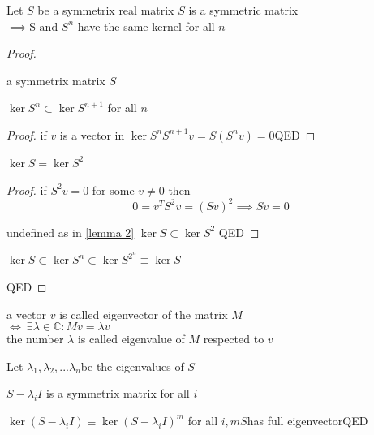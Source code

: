 \label{#1}

Let $S$ be a symmetrix real matrix
\label{same kernel lemma}
$S$ is a symmetric matrix\\$\implies $S$ \text{ and } S^n$ h​ave the same kernel for all $n$

\begin{proof}
\label{input}

​a symmetrix matrix $S$
\label{lemma 2}

$\ker S^n \subset \ker S^{n+1}$ for all $n$​

\begin{proof}
\label{#17}
if $v$ is a vector in $\ker S^n$​
\label{#18}
​$S^{n+1}v = S(S^n v) = 0$
\label{#19}
​QED

\end{proof}
\label{lemma 1}

$\ker S = \ker S^2$ ​

\begin{proof}
\label{#15}
​if $S^2v = 0$ for some $v \not = 0$ then \\$​$ $$0 = v^TS^2v = (Sv)^2 \implies Sv = 0$$

undefined%
\label{#14}
​as in \ref{lemma 2} $\ker S \subset \ker S^2$
\label{#16}
QED​

\end{proof}
\label{#13}

$\ker S \subset \ker S^n \subset \ker S^{2^n} \equiv \ker S$​
\label{#11}

QED​

\end{proof}
\label{eigenvectors definition}

a vector $v$ is called eigenvector of the matrix $M$ \\$\iff ~ \exists \lambda \in \mathbb{C} : Mv = \lambda v$ \\the number $\lambda$ is called eigenvalue of $M$ respected to $v$
​
\label{v_i definition}

Let $\lambda_1, \lambda_2,...\lambda_n$ ​​be the eigenvalues of $S$
\label{#6}

$S - \lambda_i I$ is a symmetrix matrix for all $i$​
\label{#7}

$\ker (S - \lambda_i I) \equiv \ker (S - \lambda_i I)^m$ for all $i, m$​
\label{#19}
$S$ ​​has full eigenvector
\label{conclusion}
​QED
